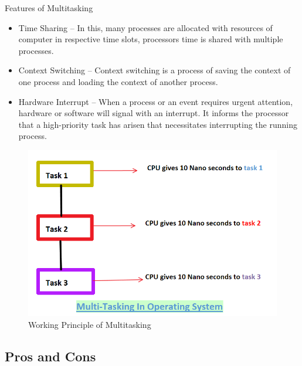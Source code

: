 \documentclass{beamer}
\begin{document}
\begin{frame}{Features of Multitasking}
    \begin{minipage}{7 cm}
    \begin{itemize}
        \item Time Sharing – In this, many processes are allocated with resources of computer in respective time slots, processors time is shared with multiple processes.
        \item Context Switching – Context switching is a process of saving the context of one process and loading the context of another process.
        \item Hardware Interrupt – When a process or an event requires urgent attention, hardware or software will signal with an interrupt. It informs the processor that a high-priority task has arisen that necessitates interrupting the running process.
    \end{itemize}
    
    \end{minipage}
    \hfill
    \begin{minipage}{5 cm}
    \begin{figure}
    
    
    \includegraphics[width = 1.0\textwidth, height = 0.4\textheight]{Multitasking-in-operating-system}
    \caption{Working Principle of Multitasking}
\end{figure}    
    \end{minipage}
\end{frame}



\subsection{Pros and Cons}
\end{document}
